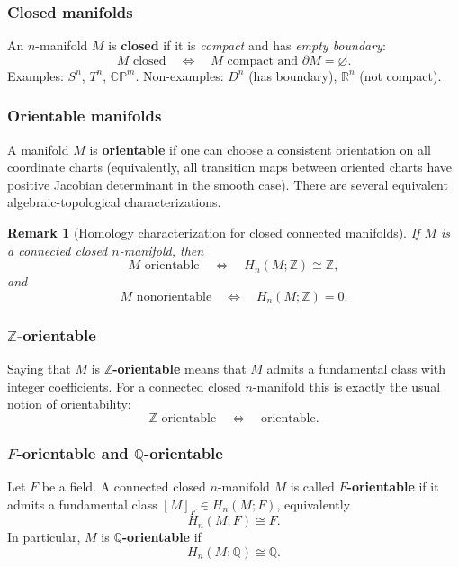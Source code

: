 \documentclass[12pt,a4paper]{article}
\theoremstyle{notespace}
\newtheorem{remark}{Remark}[section]
\begin{document}
\subsubsection{Closed manifolds}
An \(n\)-manifold \(M\) is \textbf{closed} if it is \emph{compact} and has \emph{empty boundary}:
\[
M \text{ closed}\quad \Longleftrightarrow\quad M \text{ compact and }\partial M=\varnothing.
\]
Examples: \(S^n\), \(T^n\), \(\mathbb{CP}^m\).
Non-examples: \(D^n\) (has boundary), \(\mathbb R^n\) (not compact).

\subsubsection{Orientable manifolds}
A manifold \(M\) is \textbf{orientable} if one can choose a consistent orientation on all coordinate
charts (equivalently, all transition maps between oriented charts have positive Jacobian determinant in the smooth case).
There are several equivalent algebraic-topological characterizations.

\begin{remark}[Homology characterization for closed connected manifolds]
	If \(M\) is a connected closed \(n\)-manifold, then
	\[
	M \text{ orientable}\quad \Longleftrightarrow\quad H_n(M;\mathbb Z)\cong \mathbb Z,
	\]
	and
	\[
	M \text{ nonorientable}\quad \Longleftrightarrow\quad H_n(M;\mathbb Z)=0.
	\]
\end{remark}

\subsubsection{\(\mathbb Z\)-orientable}
Saying that \(M\) is \textbf{\(\mathbb Z\)-orientable} means that \(M\) admits a fundamental class with integer coefficients.
For a connected closed \(n\)-manifold this is exactly the usual notion of orientability:
\[
\mathbb Z\text{-orientable}\quad \Longleftrightarrow\quad \text{orientable}.
\]

\subsubsection{\(F\)-orientable and \(\mathbb Q\)-orientable}
Let \(F\) be a field. A connected closed \(n\)-manifold \(M\) is called \textbf{\(F\)-orientable} if it admits a fundamental class
\([M]_F\in H_n(M;F)\), equivalently
\[
H_n(M;F)\cong F.
\]
In particular, \(M\) is \textbf{\(\mathbb Q\)-orientable} if
\[
H_n(M;\mathbb Q)\cong \mathbb Q.
\]
\end{document}
